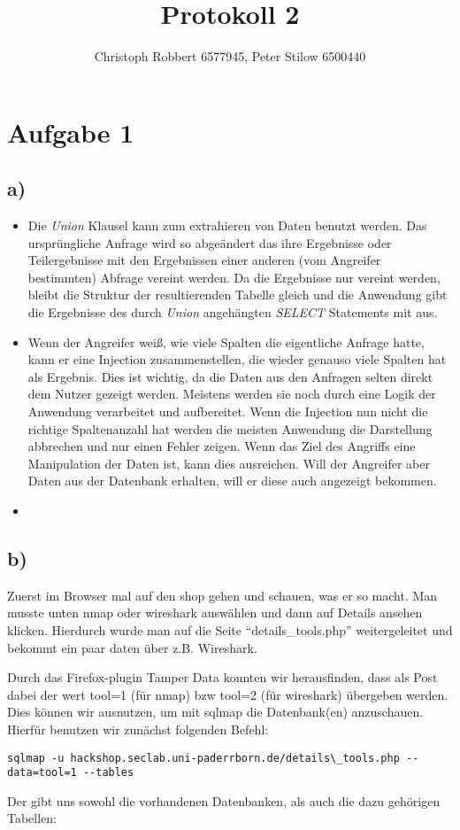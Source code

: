 \documentclass[10pt,a4paper]{article}
\author{Christoph Robbert 6577945, Peter Stilow 6500440}
\title{Protokoll 2}
\begin{document}
\maketitle
 
\section*{Aufgabe 1}

\subsection*{a)}
\begin{itemize}
	\item Die \textit{Union} Klausel kann zum extrahieren von Daten benutzt werden. Das ursprüngliche Anfrage wird so abgeändert das ihre Ergebnisse oder Teilergebnisse mit den Ergebnissen einer anderen (vom Angreifer bestimmten) Abfrage vereint werden. Da die Ergebnisse nur vereint werden, bleibt die Struktur der resultierenden Tabelle gleich und die Anwendung gibt die Ergebnisse des durch \textit{Union} angehängten \textit{SELECT} Statements mit aus.
	\item Wenn der Angreifer weiß, wie viele Spalten die eigentliche Anfrage hatte, kann er eine Injection zusammenstellen, die wieder genauso viele Spalten hat als Ergebnis. Dies ist wichtig, da die Daten aus den Anfragen selten direkt dem Nutzer gezeigt werden. Meistens werden sie noch durch eine Logik der Anwendung verarbeitet und aufbereitet. Wenn die Injection nun nicht die richtige Spaltenanzahl hat werden die meisten Anwendung die Darstellung abbrechen und nur einen Fehler zeigen. Wenn das Ziel des Angriffs eine Manipulation der Daten ist, kann dies ausreichen. Will der Angreifer aber Daten aus der Datenbank erhalten, will er diese auch angezeigt bekommen.
	\item 
\end{itemize}

\subsection*{b)}
Zuerst im Browser mal auf den shop gehen und schauen, was er so macht. Man musste unten nmap oder wireshark auswählen und dann auf Details ansehen klicken. Hierdurch wurde man auf die Seite "`details\_tools.php"' weitergeleitet und bekommt ein paar daten über z.B. Wireshark.

Durch das Firefox-plugin Tamper Data konnten wir herausfinden, dass als Post dabei der wert tool=1 (für nmap) bzw tool=2 (für wireshark) übergeben werden. Dies können wir ausnutzen, um mit sqlmap die Datenbank(en) anzuschauen. Hierfür benutzen wir zunächst folgenden Befehl:
\begin{verbatim}
sqlmap -u hackshop.seclab.uni-paderrborn.de/details\_tools.php --data=tool=1 --tables
\end{verbatim}
Der gibt uns sowohl die vorhandenen Datenbanken, als auch die dazu gehörigen Tabellen:
\end{document}
